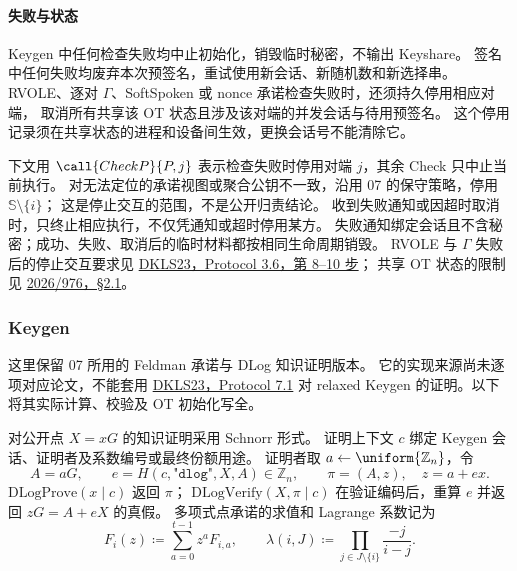 \paragraph{失败与状态} Keygen 中任何检查失败均中止初始化，销毁临时秘密，不输出 Keyshare。
签名中任何失败均废弃本次预签名，重试使用新会话、新随机数和新选择串。
RVOLE、逐对 $\Gamma$、SoftSpoken 或 nonce 承诺检查失败时，还须持久停用相应对端，
取消所有共享该 OT 状态且涉及该对端的并发会话与待用预签名。
这个停用记录须在共享状态的进程和设备间生效，更换会话号不能清除它。

下文用 $\call{CheckP}{P,j}$ 表示检查失败时停用对端 $j$，其余 Check 只中止当前执行。
对无法定位的承诺视图或聚合公钥不一致，沿用 07 的保守策略，停用 $\mathbb S\setminus\{i\}$；
这是停止交互的范围，不是公开归责结论。
收到失败通知或因超时取消时，只终止相应执行，不仅凭通知或超时停用某方。
失败通知绑定会话且不含秘密；成功、失败、取消后的临时材料都按相同生命周期销毁。
RVOLE 与 $\Gamma$ 失败后的停止交互要求见
\href{https://eprint.iacr.org/2023/765.pdf}{DKLS23，Protocol 3.6，第 8--10 步}；
共享 OT 状态的限制见 \href{https://eprint.iacr.org/2026/976.pdf}{2026/976，\S2.1}。

\subsubsection{Keygen}

这里保留 07 所用的 Feldman 承诺与 DLog 知识证明版本。
它的实现来源尚未逐项对应论文，不能套用
\href{https://eprint.iacr.org/2023/765.pdf}{DKLS23，Protocol 7.1}
对 relaxed Keygen 的证明。以下将其实际计算、校验及 OT 初始化写全。

对公开点 $X=xG$ 的知识证明采用 Schnorr 形式。
证明上下文 $c$ 绑定 Keygen 会话、证明者及系数编号或最终份额用途。
证明者取 $a\gets\uniform{\mathbb Z_n}$，令
\[
  A=aG,\qquad e=H(c,\texttt{"dlog"},X,A)\in\mathbb Z_n,
  \qquad \pi=(A,z),\quad z=a+ex.
\]
$\mathrm{DLogProve}(x\mid c)$ 返回 $\pi$；
$\mathrm{DLogVerify}(X,\pi\mid c)$ 在验证编码后，重算 $e$ 并返回 $zG=A+eX$ 的真假。
多项式点承诺的求值和 Lagrange 系数记为
\[
  F_i(z)\coloneq\sum_{a=0}^{t-1}z^aF_{i,a},\qquad
  \lambda(i,J)\coloneq\prod_{j\in J\setminus\{i\}}\frac{-j}{i-j}.
\]

